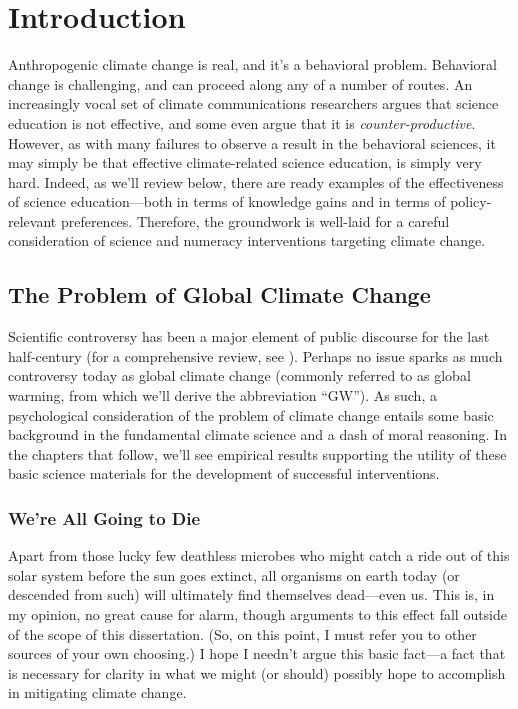 \graphicspath{{intro/}}

\chapter{Introduction} \label{chap:intro}

Anthropogenic climate change is real, and it's a behavioral problem. Behavioral
change is challenging, and can proceed along any of a number of routes. An
increasingly vocal set of climate communications researchers argues that science
education is not effective, and some even argue that it is
\emph{counter-productive}.  However, as with many failures to observe a result
in the behavioral sciences, it may simply be that effective climate-related
science education, is simply very hard. Indeed, as we'll review below, there are
ready examples of the effectiveness of science education---both in terms of
knowledge gains and in terms of policy-relevant preferences. Therefore, the
groundwork is well-laid for a careful consideration of science and numeracy
interventions targeting climate change.

\section{The Problem of Global Climate Change}

Scientific controversy has been a major element of public discourse for the last
half-century (for a comprehensive review, see ).
Perhaps no issue sparks as much controversy today as global climate change
(commonly referred to as global warming, from which we'll derive the
abbreviation “GW”). As such, a psychological consideration of the problem of
climate change entails some basic background in the fundamental climate science
and a dash of moral reasoning. In the chapters that follow, we'll see empirical
results supporting the utility of these basic science materials for the
development of successful interventions.

\subsection{We're All Going to Die}

Apart from those lucky few deathless microbes who might catch a ride out of this
solar system before the sun goes extinct, all organisms on earth today (or
descended from such) will ultimately find themselves dead---even us. This is, in
my opinion, no great cause for alarm, though arguments to this effect fall
outside of the scope of this dissertation. (So, on this point, I must refer
you to other sources of your own choosing.) I hope I needn't argue this basic
fact---a fact that is necessary for clarity in what we might (or should)
possibly hope to accomplish in mitigating climate change.

